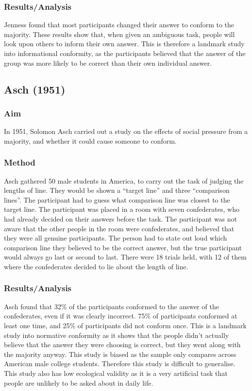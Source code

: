 \documentclass{report}
\begin{document}
\subsubsection{Results/Analysis}
Jenness found that most participants changed their answer to conform to the majority. These results show that, when given an ambiguous task, people will look upon others to inform their own answer.  This is therefore a landmark study into informational conformity, as the participants believed that the answer of the group was more likely to be correct than their own individual answer.
\subsection{Asch (1951)}
\subsubsection{Aim}
In 1951, Solomon Asch carried out a study on the effects of social pressure from a majority, and whether it could cause someone to conform.
\subsubsection{Method}
Asch gathered 50 male students in America, to carry out the task of judging the lengths of line. They would be shown a “target line” and three “comparison lines”. The participant had to guess what comparison line was closest to the target line. The participant was placed in a room with seven confederates, who had already decided on their answers before the task. The participant was not aware that the other people in the room were confederates, and believed that they were all genuine participants. The person had to state out loud which comparison line they believed to be the correct answer, but the true participant would always go last or second to last. There were 18 trials held, with 12 of them where the confederates decided to lie about the length of line.
\subsubsection{Results/Analysis}
Asch found that 32\% of the participants conformed to the answer of the confederates, even if it was clearly incorrect. 75\% of participants conformed at least one time, and 25\% of participants did not conform once. This is a landmark study into normative conformity as it shows that the people didn’t actually believe that the answer they were choosing is correct, but they went along with the majority anyway. This study is biased as the sample only compares across American male college students. Therefore this study is difficult to generalise. This study also has low ecological validity as it is a very artificial task that people are unlikely to be asked about in daily life.
\end{document}
